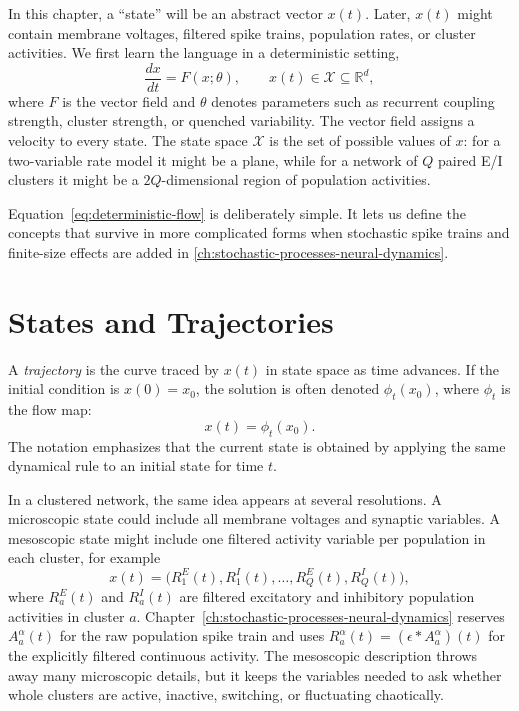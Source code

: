 In this chapter, a ``state'' will be an abstract vector $x(t)$. Later, $x(t)$ might contain membrane voltages, filtered spike trains, population rates, or cluster activities. We first learn the language in a deterministic setting,
%
\begin{equation}
  \frac{d x}{d t} = F(x;\theta),
  \qquad x(t) \in \mathcal{X} \subseteq \mathbb{R}^d,
  \label{eq:deterministic-flow}
\end{equation}
%
where $F$ is the vector field and $\theta$ denotes parameters such as recurrent coupling strength, cluster strength, or quenched variability. The vector field assigns a velocity to every state. The state space $\mathcal{X}$ is the set of possible values of $x$: for a two-variable rate model it might be a plane, while for a network of $Q$ paired E/I clusters it might be a $2Q$-dimensional region of population activities.

Equation~\eqref{eq:deterministic-flow} is deliberately simple. It lets us define the concepts that survive in more complicated forms when stochastic spike trains and finite-size effects are added in \cref{ch:stochastic-processes-neural-dynamics}.

\section{States and Trajectories}
\label{sec:states-trajectories}

A \emph{trajectory} is the curve traced by $x(t)$ in state space as time advances. If the initial condition is $x(0)=x_0$, the solution is often denoted $\phi_t(x_0)$, where $\phi_t$ is the flow map:
%
\begin{equation}
  x(t) = \phi_t(x_0).
  \label{eq:flow-map}
\end{equation}
%
The notation emphasizes that the current state is obtained by applying the same dynamical rule to an initial state for time $t$.

In a clustered network, the same idea appears at several resolutions. A microscopic state could include all membrane voltages and synaptic variables. A mesoscopic state might include one filtered activity variable per population in each cluster, for example
%
\begin{equation}
  x(t) =
  \bigl(R_1^E(t),R_1^I(t),\ldots,R_Q^E(t),R_Q^I(t)\bigr),
  \label{eq:cluster-state-vector}
\end{equation}
%
where $R_a^E(t)$ and $R_a^I(t)$ are filtered excitatory and inhibitory population activities in cluster $a$. Chapter~\ref{ch:stochastic-processes-neural-dynamics} reserves $A_a^\alpha(t)$ for the raw population spike train and uses $R_a^\alpha(t)=(\epsilon*A_a^\alpha)(t)$ for the explicitly filtered continuous activity. The mesoscopic description throws away many microscopic details, but it keeps the variables needed to ask whether whole clusters are active, inactive, switching, or fluctuating chaotically.

